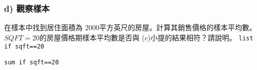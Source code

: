 \begin{frame}
    \frametitle{d) 觀察樣本 }
    在樣本中找到居住面積為 2000平方英尺的房屋。計算其銷售價格的樣本平均數。$SQFT=20$的房屋價格期樣本平均數是否與 (c)小提的結果相符？請說明。
    \vfill
    \texttt{list if sqft==20}

    \texttt{sum if sqft==20}
    

\end{frame}
